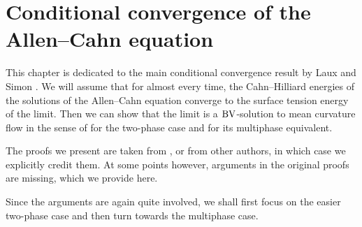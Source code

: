 \chapter{Conditional convergence of the Allen--Cahn equation}
\label{chapter_conditional_convergence_of_ac}

This chapter is dedicated to the main conditional convergence result by Laux 
and Simon 
\cite{convergence_of_allen_cahn_equation_to_multiphase_mean_curvature_flow}.
We will assume that for almost every time, the 
Cahn--Hilliard energies of the solutions of the Allen--Cahn equation converge 
to the surface tension energy of the limit. Then we can show that the limit is 
a $ \operatorname{BV} 
$-solution to mean curvature flow in the sense of  for the 
two-phase case and  for its multiphase equivalent.

The proofs we present are taken from 
\cite{convergence_of_allen_cahn_equation_to_multiphase_mean_curvature_flow}, 
or from other authors, 
in which case we explicitly credit them. At some points however, arguments 
in the original proofs are missing, which we provide here.

Since the arguments are again quite involved, we shall first focus on the 
easier 
two-phase case and then turn towards the multiphase case.



